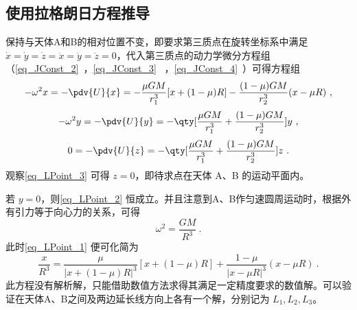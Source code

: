 

\subsection{使用拉格朗日方程推导}

保持与天体A和B的相对位置不变，即要求第三质点在旋转坐标系中满足 $\dot{x}=\dot{y}=\dot{z}=\ddot{x}=\ddot{y}=\ddot{z}=0$，代入第三质点的动力学微分方程组（\autoref{eq_JConst_2}~，\autoref{eq_JConst_3}~ ，\autoref{eq_JConst_4}~）可得方程组
\begin{equation}\label{eq_LPoint_1}
-\omega^2 x =- \pdv{U}{x}=-\frac{\mu GM}{r_1^3}[x+(1-\mu)R]-\frac{(1-\mu)GM}{r_2^3}(x-\mu R)~,
\end{equation}
\begin{equation}\label{eq_LPoint_2}
-\omega^2 y =- \pdv{U}{y}=-\qty[\frac{\mu GM}{r_1^3}+\frac{(1-\mu)GM}{r_2^3}]y~,
\end{equation}
\begin{equation}\label{eq_LPoint_3}
0 =- \pdv{U}{z} =-\qty[\frac{\mu GM}{r_1^3}+\frac{(1-\mu)GM}{r_2^3}]z~.
\end{equation}
观察\autoref{eq_LPoint_3} 可得 $z=0$，即待求点在天体 A、B 的运动平面内。

若 $y=0$，则\autoref{eq_LPoint_2} 恒成立。并且注意到A、B作匀速圆周运动时，根据外有引力等于向心力的关系，可得
\begin{equation}%
\omega^2 =\frac{GM}{R^3}~.
\end{equation}
此时\autoref{eq_LPoint_1} 便可化简为
\begin{equation}%
\frac{x}{R^3} =\frac{\mu}{|x+(1-\mu)R|^3}[x+(1-\mu)R]+\frac{1-\mu}{|x-\mu R|^3}(x-\mu R)~.
\end{equation}
此方程没有解析解，只能借助数值方法求得其满足一定精度要求的数值解。可以验证在天体A、B之间及两边延长线方向上各有一个解，分别记为 $L_1,L_2,L_3$。

